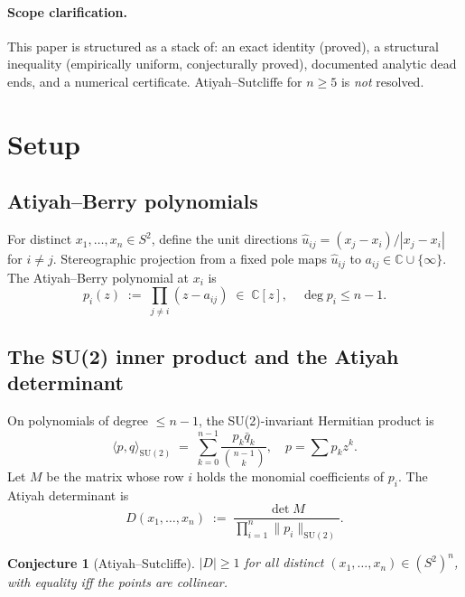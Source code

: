 \documentclass[11pt,a4paper]{article}
\newtheorem{conjecture}[theorem]{Conjecture}
\begin{document}
\paragraph{Scope clarification.}
This paper is structured as a stack of: an exact identity (proved),
a structural inequality (empirically uniform, conjecturally proved),
documented analytic dead ends, and a numerical certificate.
Atiyah--Sutcliffe for $n \ge 5$ is \emph{not} resolved.

\tableofcontents

\section{Setup}\label{sec:setup}

\subsection{Atiyah--Berry polynomials}
For distinct $x_1, \ldots, x_n \in S^2$, define the unit directions
$\hat u_{ij} = (x_j - x_i)/|x_j - x_i|$ for $i \ne j$. Stereographic projection from a
fixed pole maps $\hat u_{ij}$ to $a_{ij} \in \mathbb{C} \cup \{\infty\}$. The
Atiyah--Berry polynomial at $x_i$ is
\begin{equation}\label{eq:AB-poly}
p_i(z) \;:=\; \prod_{j \ne i}(z - a_{ij}) \;\in\; \mathbb{C}[z], \quad \deg p_i \le n-1.
\end{equation}

\subsection{The SU(2) inner product and the Atiyah determinant}
On polynomials of degree $\le n-1$, the SU(2)-invariant Hermitian product is
\[
\langle p, q\rangle_{\mathrm{SU}(2)} \;=\; \sum_{k=0}^{n-1} \frac{p_k \bar q_k}{\binom{n-1}{k}},
\quad p = \sum p_k z^k.
\]
Let $M$ be the matrix whose row $i$ holds the monomial coefficients of $p_i$.
The Atiyah determinant is
\begin{equation}\label{eq:D-def}
D(x_1, \ldots, x_n) \;:=\; \frac{\det M}{\prod_{i=1}^n \|p_i\|_{\mathrm{SU}(2)}}.
\end{equation}

\begin{conjecture}[Atiyah--Sutcliffe]\label{conj:AS}
$|D| \ge 1$ for all distinct $(x_1, \ldots, x_n) \in (S^2)^n$, with equality
iff the points are collinear.
\end{conjecture}
\end{document}
